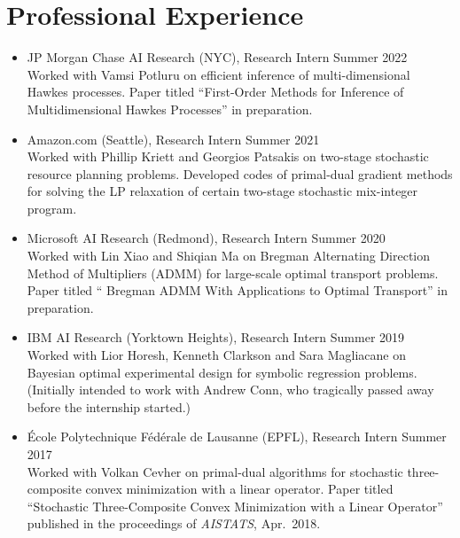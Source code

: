 \documentclass[11pt]{article}
\newcommand{\AISTATS}{Int.\ Conf.\ Artif.\ Intell.\ Stat.\ (AISTATS)}
\begin{document}

\section*{\large Professional Experience}

\begin{itemize}

\item  JP Morgan Chase AI Research (NYC), {Research Intern} \hfill Summer 2022\\[1ex]
Worked with Vamsi Potluru on efficient %
inference of multi-dimensional Hawkes processes. Paper titled ``First-Order Methods for Inference of Multidimensional Hawkes Processes'' in preparation. 

\item  Amazon.com (Seattle), {Research Intern} \hfill Summer 2021\\[1ex]
Worked with Phillip Kriett and Georgios Patsakis on two-stage stochastic resource planning problems. Developed codes of primal-dual gradient methods for solving the LP relaxation of certain two-stage stochastic mix-integer program. 

\item  Microsoft AI Research (Redmond), {Research Intern} \hfill Summer 2020\\[1ex]
Worked with Lin Xiao and Shiqian Ma on %
Bregman Alternating Direction Method of Multipliers (ADMM) for large-scale optimal transport problems.  Paper titled `` Bregman ADMM With Applications to Optimal Transport'' in preparation. 

\newpage

\item  IBM AI Research (Yorktown Heights), {Research Intern} \hfill Summer 2019\\[1ex]
Worked with Lior Horesh, Kenneth Clarkson and Sara Magliacane on Bayesian optimal experimental design for symbolic regression problems. (Initially intended to work with Andrew Conn, who tragically passed away before the internship started.)

\item  \'Ecole Polytechnique F\'ed\'erale de Lausanne (EPFL), {Research Intern} \hfill Summer 2017\\[1ex]
Worked with Volkan Cevher on primal-dual algorithms for stochastic three-composite convex minimization with a linear operator. Paper titled ``Stochastic Three-Composite Convex Minimization with a Linear Operator'' published in the proceedings of {\em AISTATS}, Apr.\ 2018. %


\end{itemize}
\end{document}
